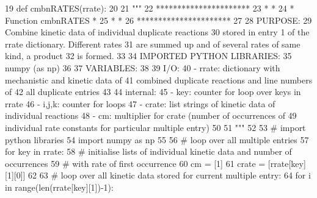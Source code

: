 \begin{DoxyCode}
19 \textcolor{keyword}{def }cmbnRATES(rrate):
20 
21     \textcolor{stringliteral}{"""}
22 \textcolor{stringliteral}{    **********************}
23 \textcolor{stringliteral}{    *                    *}
24 \textcolor{stringliteral}{    * Function cmbnRATES *}
25 \textcolor{stringliteral}{    *                    *}
26 \textcolor{stringliteral}{    **********************}
27 \textcolor{stringliteral}{}
28 \textcolor{stringliteral}{    PURPOSE:}
29 \textcolor{stringliteral}{        Combine kinetic data of individual duplicate reactions}
30 \textcolor{stringliteral}{        stored in entry 1 of the rrate dictionary. Different rates}
31 \textcolor{stringliteral}{        are summed up and of several rates of same kind, a product}
32 \textcolor{stringliteral}{        is formed.}
33 \textcolor{stringliteral}{}
34 \textcolor{stringliteral}{    IMPORTED PYTHON LIBRARIES:}
35 \textcolor{stringliteral}{        numpy (as np)}
36 \textcolor{stringliteral}{}
37 \textcolor{stringliteral}{    VARIABLES:}
38 \textcolor{stringliteral}{}
39 \textcolor{stringliteral}{    I/O:}
40 \textcolor{stringliteral}{        - rrate:    dictionary with mechanistic and kinetic data of}
41 \textcolor{stringliteral}{                    combined duplicate reactions and line numbers of}
42 \textcolor{stringliteral}{                    all duplicate entries}
43 \textcolor{stringliteral}{}
44 \textcolor{stringliteral}{    internal:}
45 \textcolor{stringliteral}{        - key:      counter for loop over keys in rrate}
46 \textcolor{stringliteral}{        - i,j,k:    counter for loops}
47 \textcolor{stringliteral}{        - crate:    list strings of kinetic data of individual reactions}
48 \textcolor{stringliteral}{        - cm:       multiplier for crate (number of occurrences of}
49 \textcolor{stringliteral}{                    individual rate constants for particular multiple entry)}
50 \textcolor{stringliteral}{}
51 \textcolor{stringliteral}{    """}
52 
53 \textcolor{comment}{# import python libraries}
54     \textcolor{keyword}{import} numpy \textcolor{keyword}{as} np
55 
56 \textcolor{comment}{# loop over all multiple entries}
57     \textcolor{keywordflow}{for} key \textcolor{keywordflow}{in} rrate:
58 \textcolor{comment}{# initialise lists of individual kinetic data and  number of occurrences}
59 \textcolor{comment}{# with rate of first occurrence}
60         cm    = [1]
61         crate = [rrate[key][1][0]]
62 
63 \textcolor{comment}{# loop over all kinetic data stored for current multiple entry:}
64         \textcolor{keywordflow}{for} i \textcolor{keywordflow}{in} range(len(rrate[key][1])-1):

\end{DoxyCode}
